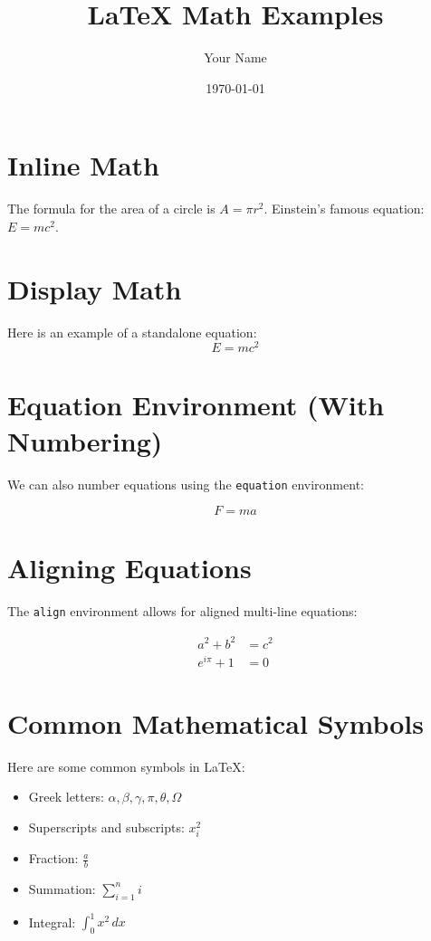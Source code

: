 \documentclass{article}
\begin{document}
\title{LaTeX Math Examples}
\author{Your Name}
\date{\today}
\maketitle

\section{Inline Math}
The formula for the area of a circle is $A = \pi r^2$.  
Einstein’s famous equation: $E = mc^2$.

\section{Display Math}
Here is an example of a standalone equation:
\[
E = mc^2
\]

\section{Equation Environment (With Numbering)}
We can also number equations using the \texttt{equation} environment:

\begin{equation}
F = ma
\end{equation}

\section{Aligning Equations}
The \texttt{align} environment allows for aligned multi-line equations:

\begin{align}
a^2 + b^2 &= c^2 \\
e^{i\pi} + 1 &= 0
\end{align}

\section{Common Mathematical Symbols}
Here are some common symbols in LaTeX:

\begin{itemize}
    \item Greek letters: $\alpha, \beta, \gamma, \pi, \theta, \Omega$
    \item Superscripts and subscripts: $x_i^2$
    \item Fraction: $\frac{a}{b}$
    \item Summation: $\sum_{i=1}^n i$
    \item Integral: $\int_0^1 x^2 \, dx$
\end{itemize}
\end{document}
